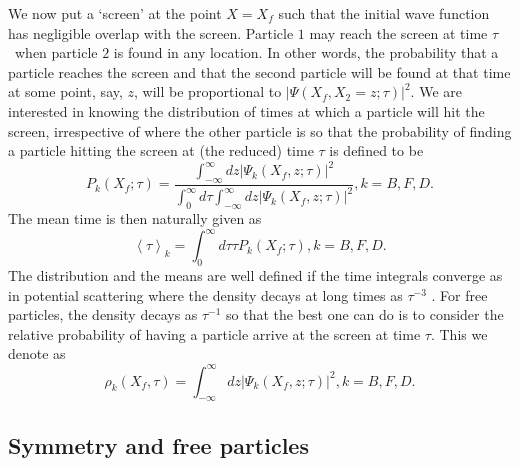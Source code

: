 \documentclass[preprint,aps]{revtex4}
\begin{document}
We now put a `screen' at the point $X=X_f$ such that the initial wave function has negligible overlap with the screen. 
Particle $1$ may reach the screen at
time $\tau $ \ when particle $2$ is found in any location. In other
words, the probability that a particle reaches the screen and that the second
particle will be found at that time at some point, say, $z$, will be
proportional to $\left\vert \Psi \left( X_f,X_{2}=z;\tau \right)
\right\vert ^{2}$. We are interested in knowing the distribution of times at
which a particle will hit the screen, irrespective of where the other
particle is so that the probability of finding a particle hitting the screen
at (the reduced) time $\tau $ is defined to be
\begin{equation}
P_{k}\left( X_f;\tau \right) =\frac{\int_{-\infty }^{\infty }dz\left\vert \Psi
_{k}\left( X_f,z;\tau \right) \right\vert ^{2}}{\int_{0}^{\infty }d\tau
\int_{-\infty }^{\infty }dz\left\vert \Psi _{k}\left( X_f,z;\tau \right)
\right\vert ^{2}},k=B,F,D.  \label{2.10}
\end{equation}%
The mean time is then naturally given as
\begin{equation}
\left\langle \tau \right\rangle _{k}=\int_{0}^{\infty }d\tau \tau
P_{k}\left( X_f;\tau \right) ,k=B,F,D.  \label{2.11}
\end{equation}%
The distribution and the means are well defined if the time integrals
converge as in potential scattering where the density decays at long times
as $\tau ^{-3}$ \cite{Muga-2008,Eli-2018}. For free particles, the density decays as $\tau ^{-1}$ so
that the best one can do is to consider the relative probability of having a
particle arrive at the screen at time $\tau $. This we denote as
\begin{equation}
\rho _{k}\left( X_f,\tau \right) =\int_{-\infty }^{\infty }dz\left\vert \Psi
_{k}\left( X_f,z;\tau \right) \right\vert ^{2},k=B,F,D.  \label{2.12}
\end{equation}

\subsection{Symmetry and free particles}
\end{document}
